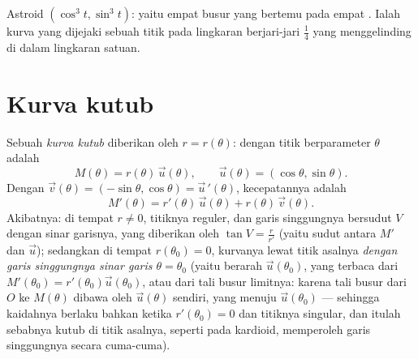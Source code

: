 \begin{omfigure}

{\small Astroid $(\cos^3 t, \sin^3 t)$: yaitu empat busur yang bertemu pada
empat . Ialah kurva yang dijejaki sebuah titik pada lingkaran berjari-jari
$\frac14$ yang menggelinding di dalam lingkaran satuan.}
\end{omfigure}

\section{Kurva kutub}

\begin{definition}\label{def:b1:curves:polar}
Sebuah \emph{kurva kutub} diberikan oleh $r = r(\theta)$:
dengan titik berparameter $\theta$ adalah
\[
M(\theta) = r(\theta)\,\vec u(\theta),
\qquad \vec u(\theta) = (\cos\theta, \sin\theta).
\]
Dengan $\vec v(\theta) = (-\sin\theta, \cos\theta) = \vec
u\,'(\theta)$, kecepatannya adalah
\[
M'(\theta) = r'(\theta)\, \vec u(\theta) + r(\theta)\, \vec
v(\theta) .
\]
Akibatnya: di tempat $r \neq 0$, titiknya reguler, dan
garis singgungnya bersudut $V$ dengan sinar garisnya, yang diberikan oleh $\tan V =
\frac{r}{r'}$ (yaitu sudut antara $M'$ dan $\vec u$); sedangkan di tempat $r(\theta_0)
= 0$, kurvanya lewat titik asalnya \emph{dengan garis singgungnya sinar garis
$\theta = \theta_0$} (yaitu berarah $\vec u(\theta_0)$, yang terbaca dari
$M'(\theta_0) = r'(\theta_0)\vec u(\theta_0)$, atau dari tali busur
limitnya: karena tali busur dari $O$ ke $M(\theta)$ dibawa oleh $\vec
u(\theta)$ sendiri, yang menuju $\vec u(\theta_0)$ --- sehingga
kaidahnya berlaku bahkan ketika $r'(\theta_0) = 0$ dan titiknya
singular, dan itulah sebabnya  kutub di titik asalnya, seperti pada
kardioid, memperoleh garis singgungnya secara cuma-cuma).
\end{definition}

